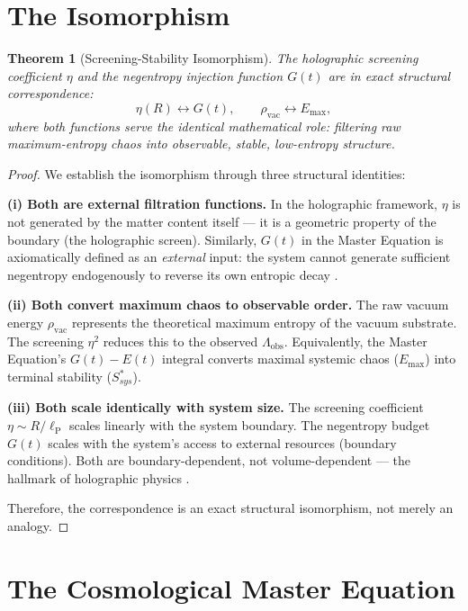 \documentclass[12pt, a4paper]{article}
\theoremstyle{plain}
\newtheorem{theorem}{Theorem}[section]
\theoremstyle{definition}
\theoremstyle{remark}
\newcommand{\lP}{\ell_{\mathrm{P}}}
\begin{document}
\section{The Isomorphism}\label{sec:isomorphism}

\begin{theorem}[Screening-Stability Isomorphism]\label{thm:iso}
The holographic screening coefficient $\eta$ and the negentropy injection function $G(t)$ are in exact structural correspondence:
\begin{equation}
    \eta(R) \leftrightarrow G(t), \qquad \rho_{\text{vac}} \leftrightarrow E_{\max},
\end{equation}
where both functions serve the identical mathematical role: filtering raw maximum-entropy chaos into observable, stable, low-entropy structure.
\end{theorem}

\begin{proof}
We establish the isomorphism through three structural identities:

\textbf{(i) Both are external filtration functions.}
In the holographic framework, $\eta$ is not generated by the matter content itself --- it is a geometric property of the boundary (the holographic screen). Similarly, $G(t)$ in the Master Equation is axiomatically defined as an \emph{external} input: the system cannot generate sufficient negentropy endogenously to reverse its own entropic decay \citep{Schrodinger1944}.

\textbf{(ii) Both convert maximum chaos to observable order.}
The raw vacuum energy $\rho_{\text{vac}}$ represents the theoretical maximum entropy of the vacuum substrate. The screening $\eta^2$ reduces this to the observed $\Lambda_{\text{obs}}$. Equivalently, the Master Equation's $G(t) - E(t)$ integral converts maximal systemic chaos ($E_{\max}$) into terminal stability ($S_{sys}^*$).

\textbf{(iii) Both scale identically with system size.}
The screening coefficient $\eta \sim R/\lP$ scales linearly with the system boundary. The negentropy budget $G(t)$ scales with the system's access to external resources (boundary conditions). Both are boundary-dependent, not volume-dependent --- the hallmark of holographic physics \citep{tHooft1993}.

Therefore, the correspondence is an exact structural isomorphism, not merely an analogy.
\end{proof}

\section{The Cosmological Master Equation}\label{sec:derivation}
\end{document}
